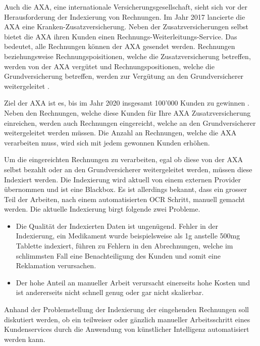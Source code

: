 \documentclass[12pt, twoside, table]{extarticle}
\begin{document}
Auch die AXA, eine internationale Versicherungsgesellschaft, sieht sich vor der Herausforderung der Indexierung von Rechnungen. Im Jahr 2017 lancierte die AXA eine Kranken-Zusatzversicherung. Neben der Zusatzversicherungen selbst bietet die AXA ihren Kunden einen Rechnungs-Weiterleitungs-Service. Das bedeutet, alle Rechnungen können der AXA gesendet werden. Rechnungen beziehungsweise Rechnungspoisitionen, welche die Zusatzversicherung betreffen, werden von der AXA vergütet und Rechnungspositionen, welche die Grundversicherung betreffen, werden zur Vergütung an den Grundversicherer weitergeleitet \cite{finanzen.ch2017AxaGewinnen}.

Ziel der AXA ist es, bis im Jahr 2020 insgesamt 100'000 Kunden zu gewinnen \cite{finanzen.ch2017AxaGewinnen}. Neben den Rechnungen, welche diese Kunden für Ihre AXA Zusatzversicherung einreichen, werden auch Rechnungen eingereicht, welche an den Grundversicherer weitergeleitet werden müssen. Die Anzahl an Rechnungen, welche die AXA verarbeiten muss, wird sich mit jedem gewonnen Kunden erhöhen.


Um die eingereichten Rechnungen zu verarbeiten, egal ob diese von der AXA selbst bezahlt oder an den Grundversicherer weitergeleitet werden, müssen diese Indexiert werden. Die Indexierung wird aktuell von einem externen Provider übernommen und ist eine Blackbox. Es ist allerdings bekannt, dass ein grosser Teil der Arbeiten, nach einem automatisierten OCR Schritt, manuell gemacht werden. Die aktuelle Indexierung birgt folgende zwei Probleme. 

\begin{itemize}
    \item Die Qualität der Indexierten Daten ist ungenügend. Fehler in der Indexierung, ein Medikament wurde beispielsweise als 1g anstelle 500mg Tablette indexiert, führen zu Fehlern in den Abrechnungen, welche im schlimmsten Fall eine Benachteiligung des Kunden und somit eine Reklamation verursachen. 
    \item Der hohe Anteil an manueller Arbeit verursacht einerseits hohe Kosten und ist andererseits nicht schnell genug oder gar nicht skalierbar.
\end{itemize}

Anhand der Problemstellung der Indexierung der eingehenden Rechnungen soll diskutiert werden, ob ein teilweiser oder gänzlich manueller Arbeitsschritt eines Kundenservices durch die Anwendung von künstlicher Intelligenz automatisiert werden kann.
\end{document}
